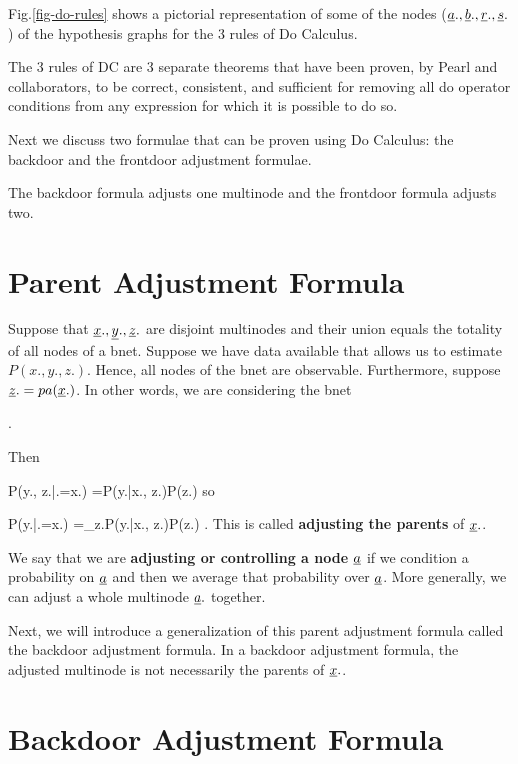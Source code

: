 Fig.\ref{fig-do-rules} shows
a pictorial representation of 
some of the nodes ($\rva., \rvb., \rvr., \rvs.$) of the 
hypothesis graphs for the 3 
 rules of Do Calculus.

The 3 rules of DC are
3 separate theorems that have
been proven, by Pearl and collaborators, to be correct,
consistent, and 
sufficient
for removing
all do operator conditions
from any expression
for
which it
is possible to do so.

Next we discuss
two formulae that can be
proven using
Do Calculus:
the backdoor and the
frontdoor
adjustment formulae.

The
backdoor formula
adjusts one multinode
and the
frontdoor formula adjusts two.



\section{Parent Adjustment Formula}


Suppose
that $\rvx., \rvy., \rvz.$
are disjoint multinodes
and their union equals
 the
totality of all nodes of
a bnet.
Suppose we have data
available that allows us  to
estimate $P(x., y., z.)$.
Hence, all nodes of the bnet
are observable.
Furthermore,
suppose $\rvz.=pa(\rvx.)$.
In other words,
we are
considering the bnet

\beq
{}
\;.
\eeq

Then

\beq
P(y., z.|\cald \rvx.=x.)
=P(y.|x., z.)P(z.)
\eeq
so

\beq
P(y.|\cald \rvx.=x.)
=\sum_{z.}P(y.|x., z.)P(z.)
\;.
\eeq
This is called
{\bf adjusting the parents}
of $\rvx.$.


We say that
we are {\bf adjusting
or controlling a node $\rva$}
if we condition
a probability on $\rva$ and
then we average
that probability over $\rva$.
More generally,
we can adjust a whole
multinode $\rva.$ together.

Next,
we will introduce
a generalization
of
this parent adjustment formula
called the
backdoor adjustment formula.
In a backdoor adjustment formula,
the adjusted multinode
is not necessarily
 the parents of $\rvx.$.

\section{Backdoor Adjustment Formula}

